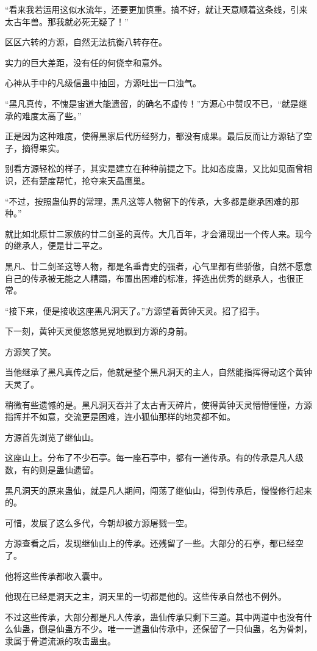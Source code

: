 \begin{this_body}
“看来我若运用这似水流年，还要更加慎重。搞不好，就让天意顺着这条线，引来太古年兽。那我就必死无疑了！”

区区六转的方源，自然无法抗衡八转存在。

实力的巨大差距，没有任的何侥幸和意外。

心神从手中的凡级信蛊中抽回，方源吐出一口浊气。

“黑凡真传，不愧是宙道大能遗留，的确名不虚传！”方源心中赞叹不已，“就是继承的难度太高了些。”

正是因为这种难度，使得黑家后代历经努力，都没有成果。最后反而让方源钻了空子，摘得果实。

别看方源轻松的样子，其实是建立在种种前提之下。比如态度蛊，又比如见面曾相识，还有楚度帮忙，抢夺来天晶鹰巢。

“不过，按照蛊仙界的常理，黑凡这等人物留下的传承，大多都是继承困难的那种。”

就比如北原廿二家族的廿二剑圣的真传。大几百年，才会涌现出一个传人来。现今的继承人，便是廿二平之。

黑凡、廿二剑圣这等人物，都是名垂青史的强者，心气里都有些骄傲，自然不愿意自己的传承被无能之人糟蹋，布置出困难的标准，择选出优秀的继承人，也很正常。

“接下来，便是接收这座黑凡洞天了。”方源望着黄钟天灵。招了招手。

下一刻，黄钟天灵便悠悠晃晃地飘到方源的身前。

方源笑了笑。

当他继承了黑凡真传之后，他就是整个黑凡洞天的主人，自然能指挥得动这个黄钟天灵了。

稍微有些遗憾的是。黑凡洞天吞并了太古青天碎片，使得黄钟天灵懵懵懂懂，方源指挥并不如意，交流更是困难，连小狐仙那样的地灵都不如。

方源首先浏览了继仙山。

这座山上。分布了不少石亭。每一座石亭中，都有一道传承。有的传承是凡人级数，有的则是蛊仙遗留。

黑凡洞天的原来蛊仙，就是凡人期间，闯荡了继仙山，得到传承后，慢慢修行起来的。

可惜，发展了这么多代，今朝却被方源屠戮一空。

方源查看之后，发现继仙山上的传承。还残留了一些。大部分的石亭，都已经空了。

他将这些传承都收入囊中。

他现在已经是洞天之主，洞天里的一切都是他的。这些传承自然也不例外。

不过这些传承，大部分都是凡人传承，蛊仙传承只剩下三道。其中两道中也没有什么仙蛊，倒是仙蛊方不少。唯一一道蛊仙传承中，还保留了一只仙蛊，名为骨刺，隶属于骨道流派的攻击蛊虫。


\end{this_body}

